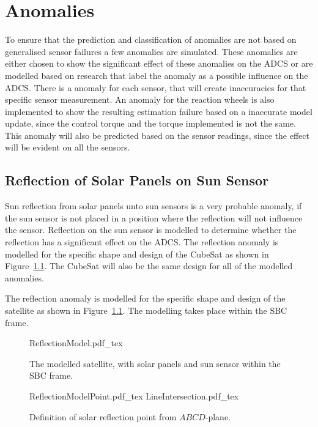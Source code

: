 \chapter{Anomalies}
\label{chap:Anomalies}
To ensure that the prediction and classification of anomalies are not based on generalised sensor failures a few anomalies are simulated. These anomalies are either chosen to show the significant effect of these anomalies on the ADCS or are modelled based on research that label the anomaly as a possible influence on the ADCS. There is a anomaly for each sensor, that will create inaccuracies for that specific sensor measurement. An anomaly for the reaction wheels is also implemented to show the resulting estimation failure based on a inaccurate model update, since the control torque and the torque implemented is not the same. This anomaly will also be predicted based on the sensor readings, since the effect will be evident on all the sensors.

\section{Reflection of Solar Panels on Sun Sensor}
\label{section:Reflection}
Sun reflection from solar panels unto sun sensors is a very probable anomaly, if the sun sensor is not placed in a position where the reflection will not influence the sensor. Reflection on the sun sensor is modelled to determine whether the reflection has a significant effect on the ADCS. The reflection anomaly is modelled for the specific shape and design of the CubeSat as shown in Figure~\ref{fig:CubeSat}. The CubeSat will also be the same design for all of the modelled anomalies.

The reflection anomaly is modelled for the specific shape and design of the satellite as shown in Figure~\ref{fig:CubeSat}.  The modelling takes place within the SBC frame.

\begin{figure}[h!t!b]
	\centering
	\def\svgwidth{12cm}
	{ReflectionModel.pdf_tex}
	\caption{The modelled satellite, with solar panels and sun sensor within the SBC frame.}
	\label{fig:CubeSat}
\end{figure}

\begin{figure*}[h!t!b]
	\centering
	\def\svgwidth{7cm}
	{ReflectionModelPoint.pdf_tex}
	\centering
	\def\svgwidth{7cm}
	{LineIntersection.pdf_tex}
	\caption{Definition of solar reflection point from $ABCD$-plane.}
	\label{fig:LineIntersection}
\end{figure*}


